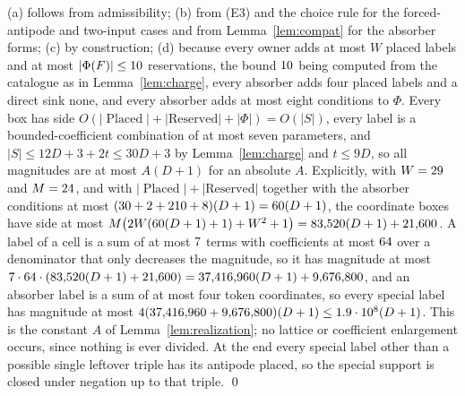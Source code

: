 \documentclass[11pt,a4paper]{article}
\theoremstyle{plain}
\theoremstyle{definition}
\theoremstyle{remark}
\DeclareMathOperator{\Placed}{Placed}
\begin{document}
(a) follows from admissibility; (b) from (E3) and the choice rule for the
forced-antipode and two-input cases and from Lemma~\ref{lem:compat} for the
absorber forms; (c) by construction; (d) because every owner adds at most $W$
placed labels and at most $|\Phi(F)|\le10$ reservations, the bound
$10$ being computed from the catalogue as in Lemma~\ref{lem:charge},
every absorber adds four placed labels and a direct sink none, and every
absorber adds at most eight conditions to $\Phi$.  Every box has side
$O(|\Placed|+|\mathrm{Reserved}|+|\Phi|)=O(|S|)$, every label is a
bounded-coefficient combination of at most seven parameters, and
$|S|\le 12D+3+2t\le 30D+3$ by Lemma~\ref{lem:charge} and $t\le 9D$, so all
magnitudes are at most $A(D+1)$ for an absolute $A$.  Explicitly, with
$W=29$ and $M=24$, and with
$|\Placed|+|\mathrm{Reserved}|$ together with the absorber conditions at most
$(30+2+210+8)(D+1)=60(D+1)$, the coordinate boxes have
side at most
$M\bigl(2W(60(D+1)+1)+W^2+1\bigr)=83{,}520(D+1)+21{,}600$.
A label of a cell is a sum of at most $7$ terms with coefficients at
most $64$ over a denominator that only decreases the magnitude, so
it has magnitude at most
$7\cdot64\cdot(83{,}520(D+1)+21{,}600)
=37{,}416{,}960(D+1)+9{,}676{,}800$, and an absorber label is a sum of at most
four token coordinates, so every special label has magnitude at most
$4(37{,}416{,}960+9{,}676{,}800)(D+1)\le1.9\cdot 10^{8}(D+1)$.  This is
the constant $A$ of Lemma~\ref{lem:realization}; no lattice or coefficient
enlargement occurs, since nothing is ever divided.  At the end every special
label other than a possible single leftover triple has its antipode placed,
so the special support is closed under negation up to that triple.  \qed




\end{document}
